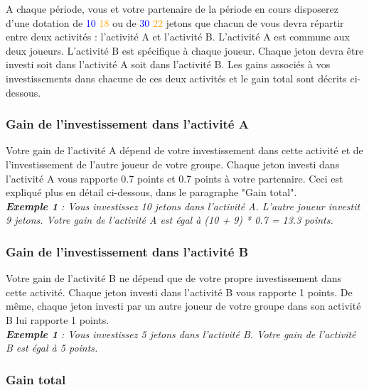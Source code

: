 \documentclass[12pt]{article}
\newcommand{\convertECU}{1 }
\newcommand{\mpcr}{0.7 }
\begin{document}
\noindent A chaque période, vous et votre partenaire de la période en cours disposerez d’une dotation de \textcolor{blue}{10} \textcolor{orange}{18} ou de \textcolor{blue}{30} \textcolor{orange}{22} jetons que chacun de vous devra répartir entre deux activités : l’activité A et l’activité B. L’activité A est commune aux deux joueurs. L’activité B est spécifique à chaque joueur. Chaque jeton devra être investi soit dans l’activité A soit dans l’activité B. Les gains associés à vos investissements dans chacune de ces deux activités et le gain total sont décrits ci-dessous. 

\subsubsection*{Gain de l’investissement dans l’activité A}

\noindent  Votre gain de l’activité A dépend de votre investissement dans cette activité et de l’investissement de l'autre joueur de votre groupe. Chaque jeton investi dans l'activité A vous rapporte \mpcr points et \mpcr points à votre partenaire. Ceci est expliqué plus en détail ci-dessous, dans le paragraphe "Gain total". \\

\noindent \textit{\textbf {Exemple 1} :
Vous investissez 10 jetons dans l’activité A. L'autre joueur investit 9 jetons. Votre gain de l’activité A est égal à (10 + 9) * 0.7 = 13.3 points.}\\

\subsubsection*{Gain de l’investissement dans l’activité B}

\noindent Votre gain de l'activité B ne dépend que de votre propre investissement dans cette activité. Chaque jeton investi dans l’activité B vous rapporte \convertECU points. De même, chaque jeton investi par un autre joueur de votre groupe dans son activité B lui rapporte \convertECU points. \\

\noindent \textit{\textbf {Exemple 1} :
Vous investissez 5 jetons dans l’activité B. Votre gain de l’activité B est égal à 5 points.}\\

\subsubsection*{Gain total}
\end{document}
